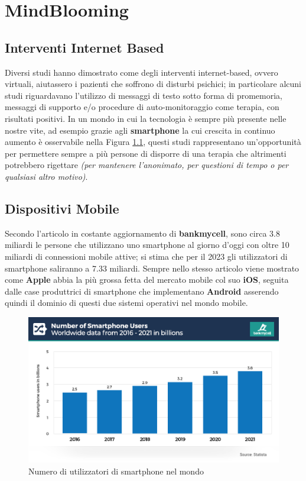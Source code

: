 \chapter{MindBlooming}
\section{Interventi Internet Based}

Diversi studi hanno dimostrato come degli interventi internet-based, ovvero virtuali, aiutassero i pazienti che soffrono di disturbi psichici\cite{taylor2003computer}; in particolare alcuni studi riguardavano l'utilizzo di messaggi di testo sotto forma di promemoria, messaggi di supporto e/o procedure di auto-monitoraggio come terapia, con risultati positivi.
In un mondo in cui la tecnologia è sempre più presente nelle nostre vite, ad esempio grazie agli \textbf{smartphone} la cui crescita in continuo aumento è osservabile nella Figura \ref{fig:smartphone_users}, questi studi rappresentano un'opportunità per permettere sempre a più persone di disporre di una terapia che altrimenti potrebbero rigettare \textit{(per mantenere l'anonimato, per questioni di tempo o per qualsiasi altro motivo)}.

\section{Dispositivi Mobile}
Secondo l'articolo in costante aggiornamento di \textbf{bankmycell}\cite{bankmycell}, sono circa 3.8 miliardi le persone che utilizzano uno smartphone al giorno d'oggi con oltre 10 miliardi di connessioni mobile attive; si stima che per il 2023 gli utilizzatori di smartphone saliranno a 7.33 miliardi. Sempre nello stesso articolo viene mostrato come \textbf{Apple} abbia la più grossa fetta del mercato mobile col suo \textbf{iOS}, seguita dalle case produttrici di smartphone che implementano \textbf{Android} asserendo quindi il dominio di questi due sistemi operativi nel mondo mobile.

\begin{figure}
\centering
\includegraphics[width=\textwidth]{img/smartphone_users}
\caption{Numero di utilizzatori di smartphone nel mondo \cite{bankmycell}}
\label{fig:smartphone_users}
\end{figure}

